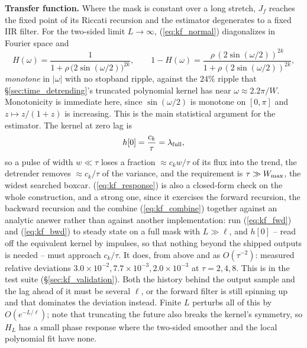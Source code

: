\documentclass{article}
\numberwithin{equation}{section}   %
\begin{document}
{\bf Transfer function.}  Where the mask is constant over a long stretch, $J_f$ reaches the fixed point of its
Riccati recursion and the estimator degenerates to a fixed IIR filter.  For the two-sided limit
$L \rightarrow \infty$, (\ref{eq:kf_normal}) diagonalizes in Fourier space and
\begin{equation}
H(\omega) = \frac{1}{1 + \rho\,\big(2\sin(\omega/2)\big)^{2k}} ,
\qquad
1 - H(\omega) = \frac{\rho\,(2\sin(\omega/2))^{2k}}{1+\rho\,(2\sin(\omega/2))^{2k}} ,
\label{eq:kf_transfer}
\end{equation}
{\em monotone} in $|\omega|$ with no stopband ripple, against the $24\%$ ripple that
\S\ref{sec:time_detrending}'s truncated polynomial kernel has near $\omega \approx 2.2\pi/W$.  Monotonicity is
immediate here, since $\sin(\omega/2)$ is monotone on $[0,\pi]$ and $z \mapsto z/(1+z)$ is increasing.  This is
the main statistical argument for the estimator.  The kernel at zero lag is
\begin{equation}
h[0] = \frac{c_k}{\tau} = \lambda_{\rm full} ,
\label{eq:kf_response}
\end{equation}
so a pulse of width $w \ll \tau$ loses a fraction $\approx c_k w/\tau$ of its flux into the trend, the
detrender removes $\approx c_k/\tau$ of the variance, and the requirement is $\tau \gg W_{\rm max}$, the
widest searched boxcar.
(\ref{eq:kf_response}) is also a closed-form check on the whole construction, and a strong one, since it
exercises the forward recursion, the backward recursion and the combine (\ref{eq:kf_combine}) together against
an analytic answer rather than against another implementation: run (\ref{eq:kf_fwd}) and (\ref{eq:kf_bwd}) to
steady state on a full mask with $L \gg \ell$, and $h[0]$ -- read off the equivalent kernel by impulses, so
that nothing beyond the shipped outputs is needed -- must approach $c_k/\tau$.  It does, from above and as
$O(\tau^{-2})$: measured relative deviations $3.0\times10^{-2}, 7.7\times10^{-3}, 2.0\times10^{-3}$ at
$\tau = 2, 4, 8$.  This is in the test suite (\S\ref{sec:kf_validation}).  Both the history behind the output
sample and the lag ahead of it must be several $\ell$, or the forward filter is still spinning up and that
dominates the deviation instead.  Finite $L$ perturbs all of this by $O(e^{-L/\ell})$; note that truncating the future
also breaks the kernel's symmetry, so $H_L$ has a small phase response where the two-sided smoother and the
local polynomial fit have none.
\end{document}
